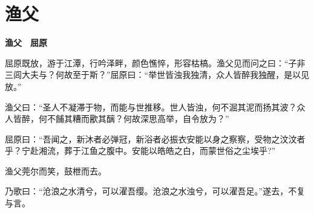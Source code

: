 \documentclass[12pt,a4paper]{ctexbook}
\begin{document}
\section{渔父}
\textbf{渔父　屈原}\par\vspace{0.5em}
屈原既放，游于江潭，行吟泽畔，颜色憔悴，形容枯槁。渔父见而问之曰：“子非三闾大夫与？何故至于斯？”屈原曰：“举世皆浊我独清，众人皆醉我独醒，是以见放。”\par
渔父曰：“圣人不凝滞于物，而能与世推移。世人皆浊，何不淈其泥而扬其波？众人皆醉，何不餔其糟而歠其醨？何故深思高举，自令放为？”\par
屈原曰：“吾闻之，新沐者必弹冠，新浴者必振衣安能以身之察察，受物之汶汶者乎？宁赴湘流，葬于江鱼之腹中。安能以皓皓之白，而蒙世俗之尘埃乎?”\par
渔父莞尔而笑，鼓枻而去。\par
乃歌曰：“沧浪之水清兮，可以濯吾缨。沧浪之水浊兮，可以濯吾足。”遂去，不复与言。\par
\end{document}
